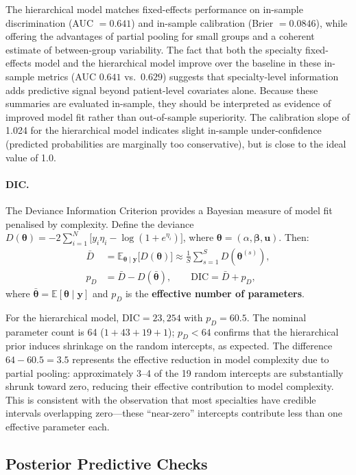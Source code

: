 \documentclass[10pt]{article}
\newcommand{\by}{\bm{y}}
\newcommand{\bbeta}{\bm{\beta}}
\newcommand{\bu}{\bm{u}}
\newcommand{\btheta}{\bm{\theta}}
\begin{document}
The hierarchical model matches fixed-effects performance on in-sample
discrimination (AUC $= 0.641$) and in-sample calibration (Brier $= 0.0846$),
while offering the advantages of partial pooling for small groups and a
coherent estimate of between-group variability. The fact that both the
specialty fixed-effects model and the hierarchical model improve over the
baseline in these in-sample metrics (AUC $0.641$ vs.\ $0.629$) suggests that
specialty-level information adds predictive signal beyond patient-level
covariates alone. Because these summaries are evaluated in-sample, they should
be interpreted as evidence of improved model fit rather than out-of-sample
superiority. The calibration slope of 1.024 for the hierarchical model
indicates slight in-sample under-confidence (predicted probabilities are
marginally too conservative), but is close to the ideal value of 1.0.

\paragraph{DIC.}  The Deviance Information Criterion \citep{spiegelhalter2002dic}
provides a Bayesian measure of model fit penalised by complexity.
Define the deviance
$D(\btheta) = -2\sum_{i=1}^{N}\bigl[y_i\eta_i - \log(1+e^{\eta_i})\bigr]$,
where $\btheta = (\alpha,\bbeta,\bu)$. Then:
\begin{align}
  \bar{D} &= \mathbb{E}_{\btheta\mid\by}\bigl[D(\btheta)\bigr]
    \approx \frac{1}{S}\sum_{s=1}^{S}D(\btheta^{(s)}), \\
  p_D &= \bar{D} - D(\bar{\btheta}), \qquad
  \text{DIC} = \bar{D} + p_D,
\end{align}
where $\bar{\btheta} = \mathbb{E}[\btheta\mid\by]$ and $p_D$ is the
\textbf{effective number of parameters}.

For the hierarchical model,
$\text{DIC} = 23{,}254$ with $p_D = 60.5$.  The nominal parameter count is 64
($1 + 43 + 19 + 1$); $p_D < 64$ confirms that the hierarchical
prior induces shrinkage on the random intercepts, as expected.  The
difference $64 - 60.5 = 3.5$ represents the effective reduction in model
complexity due to partial pooling: approximately 3--4 of the 19 random
intercepts are substantially shrunk toward zero, reducing their effective
contribution to model complexity.  This is consistent with the observation
that most specialties have credible intervals overlapping zero---these
``near-zero'' intercepts contribute less than one effective parameter each.

\subsection{Posterior Predictive Checks}
\end{document}
